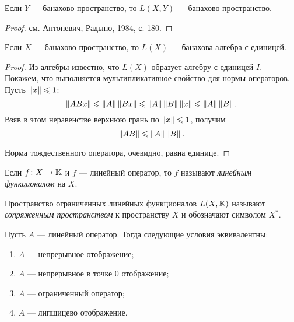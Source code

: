\begin{theorem}
    Если $Y$ --- банахово пространство, то $L(X, Y)$ --- банахово
    пространство.
\end{theorem}

\begin{proof}
   см. Антоневич, Радыно, 1984, с. 180. 
\end{proof}

\begin{corollaryth}
   Если $X$ --- банахово пространство, то $L(X)$ --- банахова алгебра с единицей.
\end{corollaryth}

\begin{proof}
    Из алгебры известно, что $L(X)$ образует алгебру с единицей $I$. Покажем, что выполняется
    мультипликативное свойство для нормы операторов. Пусть $\left\|x\right\| \leqslant 1$:
    \[ \left\|ABx\right\| \leqslant \left\|A\right\|\left\|Bx\right\| \leqslant \left\|A\right\|\left\|B\right\|\left\|x\right\| \leqslant \left\|A\right\|\left\|B\right\|. \]
    Взяв в этом неравенстве верхнюю грань по $\left\|x\right\| \leqslant 1$, получим
    \[ \left\|AB\right\| \leqslant \left\|A\right\|\left\|B\right\|. \]

    Норма тождественного оператора, очевидно, равна единице.
\end{proof}

\begin{definition}
    Если $f \colon X \to \mathbb{K}$ и $f$ --- линейный оператор,
     то $f$ называют \emph{линейным функционалом} на $X$.

    Пространство ограниченных линейных функционалов $L(X, \mathbb{K})$ называют
    \emph{сопряженным пространством} к пространству $X$ и обозначают символом $X^*$.
\end{definition}

\begin{theorem}
    Пусть $A$ --- линейный оператор. Тогда следующие условия эквивалентны:
    \begin{enumerate}
        \item $A$ --- непрерывное отображение;
        \item $A$ --- непрерывное в точке $0$ отображение;
        \item $A$ --- ограниченный оператор;
        \item $A$ --- липшицево отображение.
    \end{enumerate}
\end{theorem}

